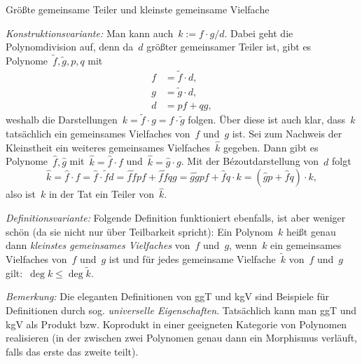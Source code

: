 \documentclass{algblatt}
\begin{document}
\begin{aufgabe}{Größte gemeinsame Teiler und kleinste gemeinsame Vielfache}
\begin{loesungE}
\emph{Konstruktionsvariante:} Man kann auch~$k := f \cdot g / d$. Dabei geht
die Polynomdivision auf, denn da~$d$ größter gemeinsamer Teiler ist, gibt es
Polynome~$\widetilde f, \widetilde g, p, q$ mit
\begin{align*}
  f &= \widetilde f \cdot d, \\
  g &= \widetilde g \cdot d, \\
  d &= p f + q g,
\end{align*}
weshalb die Darstellungen~$k = \widetilde f \cdot g = f \cdot \widetilde g$
folgen. Über diese ist auch klar, dass~$k$ tatsächlich ein gemeinsames
Vielfaches von~$f$ und~$g$ ist. Sei zum Nachweis der Kleinstheit ein weiteres
gemeinsames Vielfaches~$\widehat k$ gegeben. Dann gibt es Polynome~$\widehat f,
\widehat g$ mit~$\widehat k = \widehat f \cdot f$ und~$\widehat k = \widehat g
\cdot g$. Mit der Bézoutdarstellung von~$d$ folgt
\[ \widehat k = \widehat f \cdot f =
  \widehat f \cdot \widetilde f d =
  \widehat f \widetilde f p f + \widehat f \widetilde f q g =
  \widehat g \widetilde g p f + \widehat f q \cdot k =
  (\widehat g p + \widehat f q) \cdot k, \]
also ist~$k$ in der Tat ein Teiler von~$\widehat k$.

\emph{Definitionsvariante:} Folgende Definition funktioniert ebenfalls, ist aber weniger
schön (da sie nicht nur über Teilbarkeit spricht): Ein Polynom~$k$ heißt genau
dann \emph{kleinstes gemeinsames Vielfaches} von~$f$ und~$g$, wenn~$k$ ein
gemeinsames Vielfaches von~$f$ und~$g$ ist und für jedes gemeinsame
Vielfache~$\widetilde k$ von~$f$ und~$g$ gilt:~$\deg k \leq \deg \widetilde k$.

\emph{Bemerkung:} Die eleganten Definitionen von ggT und kgV sind Beispiele für
Definitionen durch sog. \emph{universelle Eigenschaften}. Tatsächlich kann man
ggT und kgV als Produkt bzw. Koprodukt in einer geeigneten Kategorie von
Polynomen realisieren (in der zwischen zwei Polynomen genau dann ein Morphismus
verläuft, falls das erste das zweite teilt).
\end{loesungE}
\end{aufgabe}
\end{document}
